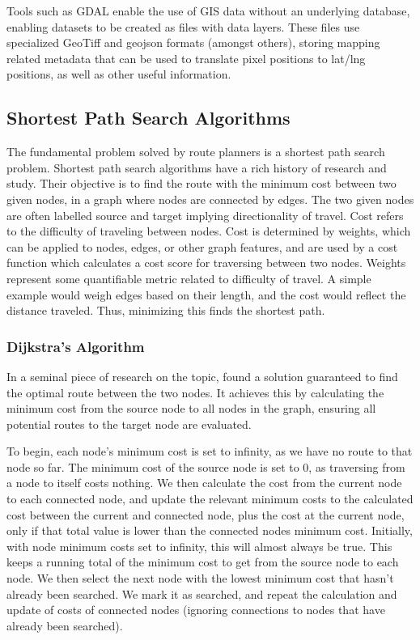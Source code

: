 \documentclass[12pt]{article}
\begin{document}
Tools such as GDAL enable the use of GIS data without an underlying database, enabling datasets to be created as files with data layers. These  files use specialized GeoTiff and geojson formats (amongst others), storing mapping related metadata that can be used to translate pixel positions to lat/lng positions, as well as other useful information.


\subsection{Shortest Path Search Algorithms}

The fundamental problem solved by route planners is a shortest path search problem.
Shortest path search algorithms have a rich history of research and study. Their objective is to find the route with the minimum cost between two given nodes, in a graph where nodes are connected by edges. The two given nodes are often labelled source and target implying directionality of travel. Cost refers to the difficulty of traveling between nodes. Cost is determined by weights, which can be applied to nodes, edges, or other graph features, and are used by a cost function which calculates a cost score for traversing between two nodes. Weights represent some quantifiable metric related to difficulty of travel. A simple example would weigh edges based on their length, and the cost would reflect the distance traveled. Thus, minimizing this finds the shortest path.

\subsubsection{Dijkstra's Algorithm}

In a seminal piece of research on the topic, \textcite{dijkstra1959} found a solution guaranteed to find the optimal route between the two nodes. It achieves this by calculating the minimum cost from the source node to all nodes in the graph, ensuring all potential routes to the target node are evaluated.

To begin, each node's minimum cost is set to infinity, as we have no route to that node so far. The minimum cost of the source node is set to 0, as traversing from a node to itself costs nothing. We then calculate the cost from the current node to each connected node, and update the relevant minimum costs to the calculated cost between the current and connected node, plus the cost at the current node, only if that total value is lower than the connected nodes minimum cost. Initially, with node minimum costs set to infinity, this will almost always be true. This keeps a running total of the minimum cost to get from the source node to each node. We then select the next node with the lowest minimum cost that hasn't already been searched. We mark it as searched, and repeat the calculation and update of costs of connected nodes (ignoring connections to nodes that have already been searched).
\end{document}
